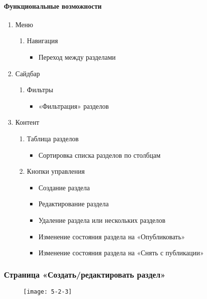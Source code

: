 \paragraph{Функциональные возможности}
\begin{enumerate}
	\item Меню
	\begin{enumerate}
		\item Навигация
		\begin{itemize}
			\item Переход между разделами
		\end{itemize}
	\end{enumerate}

	\item Сайдбар
	\begin{enumerate}
		\item Фильтры
		\begin{itemize}
			\item «Фильтрация» разделов
		\end{itemize}
	\end{enumerate}

	\item Контент
	\begin{enumerate}
		\item Таблица разделов
		\begin{itemize}
			\item Сортировка списка разделов по столбцам
		\end{itemize}

		\item Кнопки управления
		\begin{itemize}
			\item Создание раздела
			\item Редактирование раздела
			\item Удаление раздела или нескольких разделов
			\item Изменение состояния раздела на «Опубликовать»
			\item Изменение состояния раздела на «Снять с публикации»
		\end{itemize}
	\end{enumerate}
\end{enumerate}

\subsubsection{Страница «Создать/редактировать раздел»}
\begin{figure}[H]
	\texttt{[image: 5-2-3]}
\end{figure}
